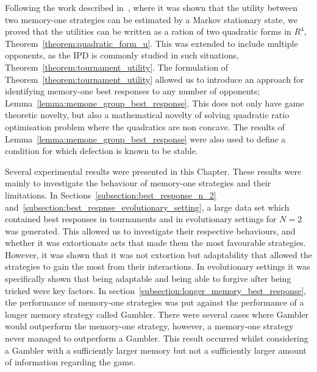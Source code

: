 Following the work described in~\cite{Nowak1989}, where it was shown that the
utility between two memory-one strategies can be estimated by a Markov
stationary state, we proved that the utilities can be written as a ration of two
quadratic forms in $R^4$, Theorem~\ref{theorem:quadratic_form_u}. This was
extended to include multiple opponents, as the IPD is commonly studied in such
situations, Theorem~\ref{theorem:tournament_utility}.
The formulation of Theorem~\ref{theorem:tournament_utility} allowed us to introduce an approach for identifying
memory-one best responses to any number of opponents;
Lemma~\ref{lemma:memone_group_best_response}. This does not only have game
theoretic novelty, but also a mathematical novelty of solving quadratic ratio
optimisation problem where the quadratics are non concave. The results of
Lemma~\ref{lemma:memone_group_best_response} were also used to define a
condition for which defection is known to be stable.

Several experimental results were presented in this Chapter. These results were mainly to
investigate the behaviour of memory-one strategies and their limitations. In
Sections~\ref{subsection:best_response_n_2}
and~\ref{subsection:best_respnse_evolutionary_setting}, a large data set which
contained best responses in tournaments and in evolutionary settings for $N=2$
was generated. This allowed us to investigate their respective behaviours, and
whether it was extortionate acts that made them the most favourable strategies.
However, it was shown that it was not extortion but adaptability that allowed
the strategies to gain the most from their interactions.
In evolutionary settings it was specifically shown that being adaptable and being
able to forgive after being tricked were key factors. In section~\ref{subsection:longer_memory_best_response}, the performance of
memory-one strategies was put against the performance of a longer memory
strategy called Gambler. There were several cases where Gambler would outperform
the memory-one strategy, however, a memory-one strategy never managed to outperform
a Gambler. This result occurred whilst considering a Gambler with a sufficiently
larger memory but not a sufficiently larger amount of information regarding
the game.
